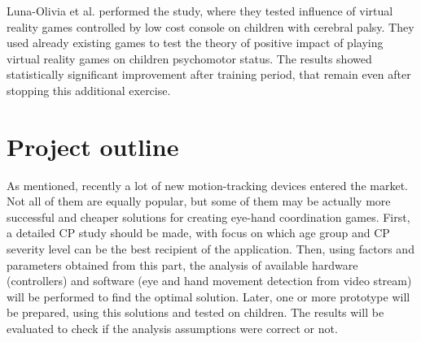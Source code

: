 Luna-Olivia et al. \cite{game_xbox_360} performed the study, where they tested influence of virtual reality games controlled by low cost console on children with cerebral palsy. They used already existing games to test the theory of positive impact of playing virtual reality games on children psychomotor status. The results showed statistically significant improvement after training period, that remain even after stopping this additional exercise. 

\section{Project outline}

As mentioned, recently a lot of new motion-tracking devices entered the market. Not all of them are equally popular, but some of them may be actually more successful and cheaper solutions for creating eye-hand coordination games. First, a detailed CP study should be made, with focus on which age group and CP severity level can be the best recipient of the application. Then, using factors and parameters obtained from this part, the analysis of available hardware (controllers) and software (eye and hand movement detection from video stream) will be performed to find the optimal solution.
Later, one or more prototype will be prepared, using this solutions and tested on children. The results will be evaluated to check if the analysis assumptions were correct or not. 